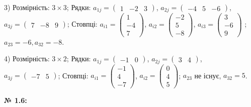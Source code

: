 \documentclass[12pt,a4paper]{article}
\begin{document}
    \vspace{1em}
    3) Розмірність: $3\times3$; Рядки: \( a_{1j} = 
    \begin{pmatrix}
    1 & -2 & 3 
    \end{pmatrix}
    \), \( a_{2j} = 
    \begin{pmatrix}
    -4 & 5 & -6
    \end{pmatrix}\), \( a_{3j} = 
    \begin{pmatrix}
    7 & -8 & 9
    \end{pmatrix}
    \); Стовпці: \( a_{i1} = 
    \begin{pmatrix}
    1 \\
    -4 \\
    7
    \end{pmatrix}
    \), \( a_{i2} = 
    \begin{pmatrix}
    -2 \\
    5 \\
    -8
    \end{pmatrix}
    \), \( a_{i3} = 
    \begin{pmatrix}
    3 \\
    -6 \\
    9
    \end{pmatrix}
    \)
    ; $a_{23} = -6, a_{32} = -8$.

    \vspace{1em}
    4) Розмірність: $3\times2$; Рядки: \( a_{1j} = 
    \begin{pmatrix}
    -1 & 0 
    \end{pmatrix}
    \), \( a_{2j} = 
    \begin{pmatrix}
    3 & 4
    \end{pmatrix}\), \( a_{3j} = 
    \begin{pmatrix}
    -7 & 5
    \end{pmatrix}
    \); Стовпці: \( a_{i1} = 
    \begin{pmatrix}
    -1 \\
    4 \\
    -7
    \end{pmatrix}
    \), \( a_{i2} = 
    \begin{pmatrix}
    0 \\
    4 \\
    5
    \end{pmatrix}
    \); $a_{23}$ не існує, $a_{32} = 5$.

    \vspace{1em}

    \noindent \textbf{№ 1.6:}
\end{document}

